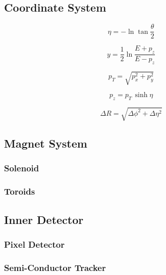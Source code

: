 \subsection{Coordinate System}

\begin{equation}
\label{eq:cern:eta}
\eta = - \ln \tan \frac{\theta}{2}
\end{equation}

\begin{equation}
\label{eq:cern:y}
y = \frac{1}{2} \ln \frac{E + p_z}{E - p_z}
\end{equation}

\begin{equation}
\label{eq:cern:pt}
p_T = \sqrt{p_x^2 + p_y^2}
\end{equation}

\begin{equation}
\label{eq:cern:pz}
p_z = p_T \,\sinh \eta
\end{equation}

\begin{equation}
\label{eq:cern:dR}
\Delta R = \sqrt{ \Delta \phi^2 + \Delta \eta^2  }
\end{equation}




\subsection{Magnet System}
\label{sec:cern:atlasmagnets}

\subsubsection*{Solenoid}

\subsubsection*{Toroids}



\subsection{Inner Detector}



\subsubsection*{Pixel Detector}


\subsubsection*{Semi-Conductor Tracker}


